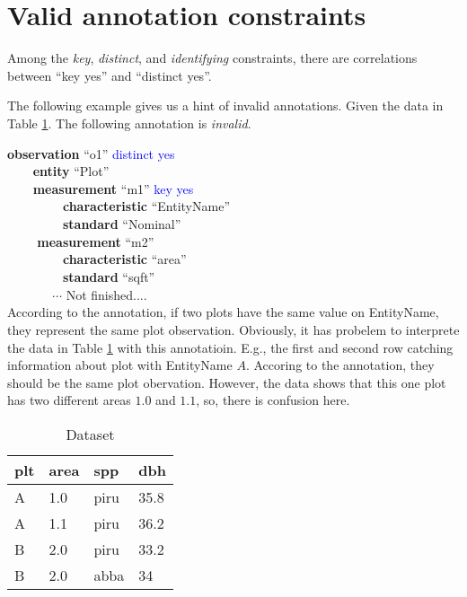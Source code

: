 \documentclass[10pt]{article}
\begin{document}
\section{Valid annotation constraints}
Among the {\em key}, {\em distinct}, and {\em identifying} constraints,
there are correlations between ``key yes'' and ``distinct yes''.

The following example gives us a hint of invalid annotations. Given the data in Table \ref{tb:pltarea}. The following annotation is {\em invalid}.

\noindent
{\bf observation} ``o1''  \textcolor{blue}{distinct yes}\\
\verb|    |{\bf  entity} ``Plot''\\
\verb|    |{\bf measurement} ``m1'' \textcolor{blue}{key yes}\\
\verb|        | {\bf characteristic} ``EntityName'' \\
\verb|        | {\bf standard} ``Nominal''\\
\verb|    | {\bf measurement} ``m2''\\
\verb|        | {\bf characteristic} ``area'' \\
\verb|        | {\bf standard} ``sqft''\\
\verb|       |$\cdots$ Not finished....
\\
According to the annotation, if two plots have the same value on EntityName, they represent the same plot observation. 
Obviously, it has probelem to interprete the data in Table \ref{tb:pltarea} with this annotatioin. 
E.g., the first and second row catching information about plot with EntityName $A$. Accoring to the annotation, they should be the same plot obervation.
However, the data shows that this one plot has two different areas $1.0$ and $1.1$, so, there is confusion here.
\\
\begin{table}[htb]
\begin{center}
\begin{tabular}{|l|l|l|l|}
\hline
plt & area & spp & dbh\\\hline
A & 1.0 & piru & 35.8 \\\hline
A & 1.1 & piru & 36.2 \\\hline
B & 2.0 &piru &33.2 \\\hline
B& 2.0 & abba&34\\\hline
\end{tabular}\\
\end{center}
\vspace{-0.2in}
\caption{Dataset}
\label{tb:pltarea}
\end{table}
\end{document}
